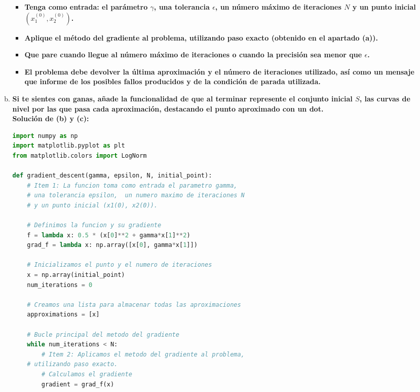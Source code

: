 \begin{enumerate}
\begin{enumerate}[(a)]
\begin{itemize}
		\item \textbf{\boldmath Tenga como entrada: el parámetro $\gamma$, una tolerancia $\epsilon$, un número máximo de iteraciones $N$ y un punto inicial $\left(x_1^{(0)},x_2^{(0)}\right)$.}\\

		\item \textbf{Aplique el método del gradiente al problema, utilizando paso exacto (obtenido en el apartado (a)).}\\

		\item \textbf{\boldmath Que pare cuando llegue al número máximo de iteraciones o cuando la precisión sea menor que $\epsilon$.}\\

		\item \textbf{El problema debe devolver la última aproximación y el número de iteraciones utilizado, así como un mensaje que informe de los posibles fallos producidos y de la condición de parada utilizada.}\\

	    \end{itemize}


	\item \textbf{Si te sientes con ganas, añade la funcionalidad de que al terminar represente el conjunto inicial $S$, las curvas de nivel por las que pasa cada aproximación, destacando el punto aproximado con un dot.}\\

	    \textbf{Solución de (b) y (c):}
\begin{lstlisting}[language=Python]
import numpy as np
import matplotlib.pyplot as plt
from matplotlib.colors import LogNorm

def gradient_descent(gamma, epsilon, N, initial_point):
    # Item 1: La funcion toma como entrada el parametro gamma,
    # una tolerancia epsilon,  un numero maximo de iteraciones N 
    # y un punto inicial (x1(0), x2(0)).
    
    # Definimos la funcion y su gradiente
    f = lambda x: 0.5 * (x[0]**2 + gamma*x[1]**2)
    grad_f = lambda x: np.array([x[0], gamma*x[1]])

    # Inicializamos el punto y el numero de iteraciones
    x = np.array(initial_point)
    num_iterations = 0

    # Creamos una lista para almacenar todas las aproximaciones
    approximations = [x]

    # Bucle principal del metodo del gradiente
    while num_iterations < N:
        # Item 2: Aplicamos el metodo del gradiente al problema, 
	# utilizando paso exacto.
        # Calculamos el gradiente
        gradient = grad_f(x)


\end{lstlisting}
\end{enumerate}
\end{enumerate}
